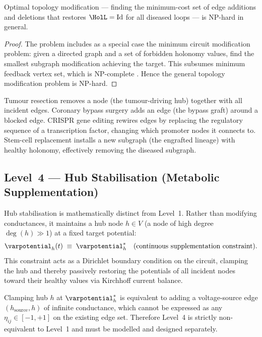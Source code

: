 \begin{proposition}
\label{prop:level3-nphard}
Optimal topology modification — finding the minimum-cost set of edge additions
and deletions that restores $\HolL = \mathrm{Id}$ for all diseased loops — is
NP-hard in general.
\end{proposition}

\begin{proof}
The problem includes as a special case the minimum circuit modification problem:
given a directed graph and a set of forbidden holonomy values, find the
smallest subgraph modification achieving the target.  This subsumes minimum
feedback vertex set, which is NP-complete \citep{Karp1972}.  Hence the general
topology modification problem is NP-hard.
\end{proof}

\begin{remark}
Tumour resection removes a node (the tumour-driving hub) together with all
incident edges.  Coronary bypass surgery adds an edge (the bypass graft)
around a blocked edge.  CRISPR gene editing rewires edges by replacing the
regulatory sequence of a transcription factor, changing which promoter nodes
it connects to.  Stem-cell replacement installs a new subgraph (the engrafted
lineage) with healthy holonomy, effectively removing the diseased subgraph.
\end{remark}

\subsection{Level~4 — Hub Stabilisation (Metabolic Supplementation)}

Hub stabilisation is mathematically distinct from Level~1.  Rather than
modifying conductances, it maintains a hub node $h \in V$ (a node of high
degree $\deg(h) \gg 1$) at a fixed target potential:
\begin{equation}
  \varpotential_h(t) \;\equiv\; \varpotential_h^*
  \quad \text{(continuous supplementation constraint)}.
  \label{eq:hub-stabilisation}
\end{equation}
This constraint acts as a Dirichlet boundary condition on the circuit, clamping
the hub and thereby passively restoring the potentials of all incident nodes
toward their healthy values via Kirchhoff current balance.

\begin{proposition}
\label{prop:level4}
Clamping hub $h$ at $\varpotential_h^*$ is equivalent to adding a
voltage-source edge $(h_{\mathrm{source}}, h)$ of infinite conductance, which
cannot be expressed as any $\eta_{ij} \in [-1,+1]$ on the existing edge set.
Therefore Level~4 is strictly non-equivalent to Level~1 and must be modelled
and designed separately.
\end{proposition}

